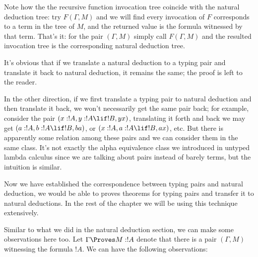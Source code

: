 \documentclass[../../../include/open-logic-section]{subfiles}
\begin{document}
Note how the the recursive function invocation tree coincide with the natural
deduction tree: try $F(\Gamma, M)$ and we will find every invocation
of $F$ corresponds to a term in the tree of $M$, and the returned
value is the formula witnessed by that term. That's it: for the pair
$(\Gamma, M)$ simply call $F(\Gamma, M)$ and the resulted invocation
tree is the corresponding natural deduction tree.

It's obvious that if we translate a natural deduction to a
typing pair and translate it back to natural deduction, it remains the
same; the proof is left to the reader.

In the other direction, if we first translate a typing pair to natural
deduction and then translate it back, we won't necessarily get the
same pair back; for example, consider the pair $(x:!A, y:!A \lif !B, y x)$,
translating it forth and back we may get $(a:!A, b:!A \lif !B, b a)$,
or $(x:!A, a:!A \lif !B, a x)$, etc. But there is apparently some
relation among these pairs and we can consider them in the same class.
It's not exactly the alpha equivalence class we introduced in untyped
lambda calculus since we are talking about pairs instead of
barely terms, but the intuition is similar.

Now we have established the correspondence between typing pairs and
natural deduction, we would be able to proves theorems for typing
pairs and transfer it to natural deductions. In the rest of the
chapter we will be using this technique extensively.

Similar to what we did in the natural deduction section, we can make
some observations here too. Let $\Gamma \Proves M:!A$ denote that
there is a pair $(\Gamma, M)$ witnessing the formula $!A$. We can have
the following observations:
\end{document}
